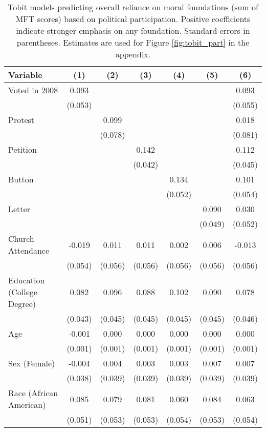 \begin{table}[ht]
\centering
\caption{Tobit models predicting overall reliance on moral foundations
           (sum of MFT scores) based on political participation. Positive coefficients indicate 
           stronger emphasis on any foundation. Standard errors in parentheses. Estimates are 
           used for Figure \ref{fig:tobit_part} in the appendix.} 
\label{tab:tobit_part}
\begingroup\footnotesize
\begin{tabular}{lcccccc}
  \hline
Variable & (1) & (2) & (3) & (4) & (5) & (6) \\ 
  \hline
Voted in 2008 &  0.093 &  &  &  &  &  0.093 \\ 
   & (0.053) &  &  &  &  & (0.055) \\ 
  Protest &  &  0.099 &  &  &  &  0.018 \\ 
   &  & (0.078) &  &  &  & (0.081) \\ 
  Petition &  &  &  0.142 &  &  &  0.112 \\ 
   &  &  & (0.042) &  &  & (0.045) \\ 
  Button &  &  &  &  0.134 &  &  0.101 \\ 
   &  &  &  & (0.052) &  & (0.054) \\ 
  Letter &  &  &  &  &  0.090 &  0.030 \\ 
   &  &  &  &  & (0.049) & (0.052) \\ 
  Church Attendance & -0.019 &  0.011 &  0.011 &  0.002 &  0.006 & -0.013 \\ 
   & (0.054) & (0.056) & (0.056) & (0.056) & (0.056) & (0.056) \\ 
  Education (College Degree) &  0.082 &  0.096 &  0.088 &  0.102 &  0.090 &  0.078 \\ 
   & (0.043) & (0.045) & (0.045) & (0.045) & (0.045) & (0.046) \\ 
  Age & -0.001 &  0.000 &  0.000 &  0.000 &  0.000 &  0.000 \\ 
   & (0.001) & (0.001) & (0.001) & (0.001) & (0.001) & (0.001) \\ 
  Sex (Female) & -0.004 &  0.004 &  0.003 &  0.003 &  0.007 &  0.007 \\ 
   & (0.038) & (0.039) & (0.039) & (0.039) & (0.039) & (0.039) \\ 
  Race (African American) &  0.085 &  0.079 &  0.081 &  0.060 &  0.084 &  0.063 \\ 
   & (0.051) & (0.053) & (0.053) & (0.054) & (0.053) & (0.054) \\ 

\end{tabular}
\end{table}
